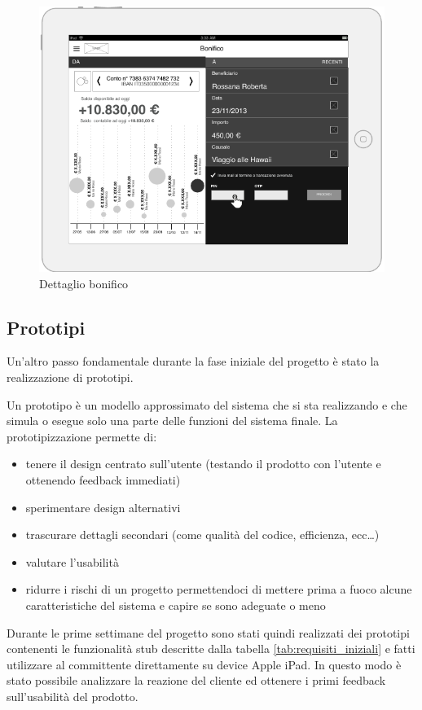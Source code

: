 \begin{figure}[!htbp]
\centering
\includegraphics[scale=1.0]{primo_wireframe/bonifico2.png}
\caption{Dettaglio bonifico}
\end{figure}

\newpage
\subsection{Prototipi}
Un'altro passo fondamentale durante la fase iniziale del progetto è stato la realizzazione di prototipi.

Un prototipo è un modello approssimato del sistema che si sta realizzando e che simula o esegue solo una parte delle funzioni del sistema finale.
La prototipizzazione permette di:

\begin{itemize}
  \item tenere il design centrato sull’utente (testando il prodotto con l'utente e ottenendo feedback immediati)
  \item sperimentare design alternativi
  \item trascurare dettagli secondari (come qualità del codice, efficienza, ecc\dots) 
  \item valutare l'usabilità
  \item ridurre i rischi di un progetto permettendoci di mettere prima a fuoco alcune caratteristiche del sistema e capire se sono adeguate o meno
\end{itemize}

Durante le prime settimane del progetto sono stati quindi realizzati dei prototipi contenenti le funzionalità stub descritte dalla tabella \ref{tab:requisiti_iniziali} e fatti utilizzare al committente direttamente su device Apple iPad. In questo modo è stato possibile analizzare la reazione del cliente ed ottenere i primi feedback sull'usabilità del prodotto.
